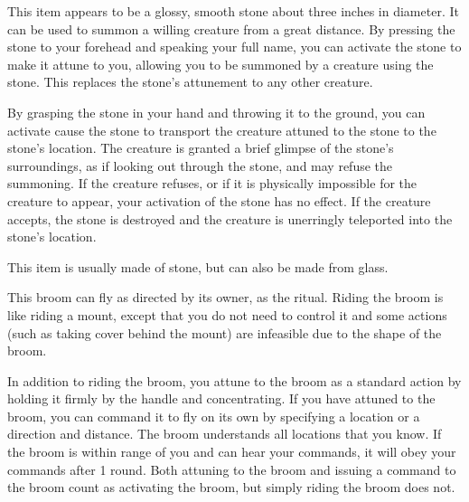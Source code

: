 
         This item appears to be a glossy, smooth stone about three inches in diameter.
        It can be used to summon a willing creature from a great distance.
        By pressing the stone to your forehead and speaking your full name, you can activate the stone to make it attune to you, allowing you to be summoned by a creature using the stone.
        This replaces the stone's attunement to any other creature.

        By grasping the stone in your hand and throwing it to the ground, you can activate cause the stone to transport the creature attuned to the stone to the stone's location.
        The creature is granted a brief glimpse of the stone's surroundings, as if looking out through the stone, and may refuse the summoning.
        If the creature refuses, or if it is physically impossible for the creature to appear, your activation of the stone has no effect.
        If the creature accepts, the stone is destroyed and the creature is unerringly teleported into the stone's location.

        This item is usually made of stone, but can also be made from glass.


         This broom can fly as directed by its owner, as the  ritual.
        Riding the broom is like riding a mount, except that you do not need to control it and some actions (such as taking cover behind the mount) are infeasible due to the shape of the broom.

        In addition to riding the broom, you attune to the broom as a standard action by holding it firmly by the handle and concentrating.
        If you have attuned to the broom, you can command it to fly on its own by specifying a location or a direction and distance.
        The broom understands all locations that you know.
        If the broom is within \rngext range of you and can hear your commands, it will obey your commands after 1 round.
        Both attuning to the broom and issuing a command to the broom count as activating the broom, but simply riding the broom does not.

